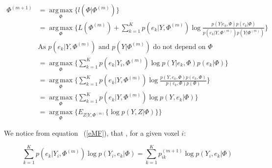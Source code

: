   \begin{align}\label{eMF}
  \Phi^{(m+1)} &= \operatorname*{arg\,max}_\Phi \{l(\Phi|\Phi^{(m)})\} \nonumber \\         
             &= \operatorname*{arg\,max}_\Phi \{L(\Phi^{(m)}) + \sum_{k=1}^K   p(e_{k}|Y,\Phi^{(m)})\operatorname*{log} \frac{p(Y|e_{k},\Phi)p(e_{k}|\Phi)}{p(e_{k}|Y,\Phi^{(m)})p(Y|\Phi^{(m)})}\} \nonumber \\
             &\mbox{As $p(e_{k}|Y,\Phi^{(m)})$ and $p(Y|\Phi^{(m)})$ do not depend on $\Phi$} \nonumber \\
             &=\operatorname*{arg\,max}_\Phi \{\sum_{k=1}^K   p(e_{k}|Y_i,\Phi^{(m)})\operatorname*{log} p(Y|e_{k},\Phi)p(e_{k}|\Phi) \} \nonumber \\
             &=\operatorname*{arg\,max}_\Phi \{\sum_{k=1}^K   p(e_{k}|Y,\Phi^{(m)})\operatorname*{log} \frac{p(Y,e_{k},\Phi)p(e_{k},\Phi)}{p(e_{k},\Phi)p(\Phi)}\}      \nonumber \\
             &=\operatorname*{arg\,max}_\Phi \{\sum_{k=1}^K   p(e_{k}|Y,\Phi^{(m)})\operatorname*{log} p(Y,e_{k}|\Phi)\} \\
             &=\operatorname*{arg\,max}_\Phi \{ E_{Z|Y,\Phi^{(m)}} \{\operatorname*{log} p(Y,Z|\Phi)\}\} \nonumber
  \end{align}
  
We notice from equation ~(\ref{eMF}), that , for a given voxel $i$:

  \begin{equation}\label{BAYES}
  \sum_{k=1}^K   p(e_{k}|Y_i,\Phi^{(m)})\operatorname*{log} p(Y_i,e_{k}|\Phi) = \sum_{k=1}^K   p_{ik}^{(m+1)}\operatorname*{log} p(Y_i,e_{k}|\Phi)
  \end{equation}

